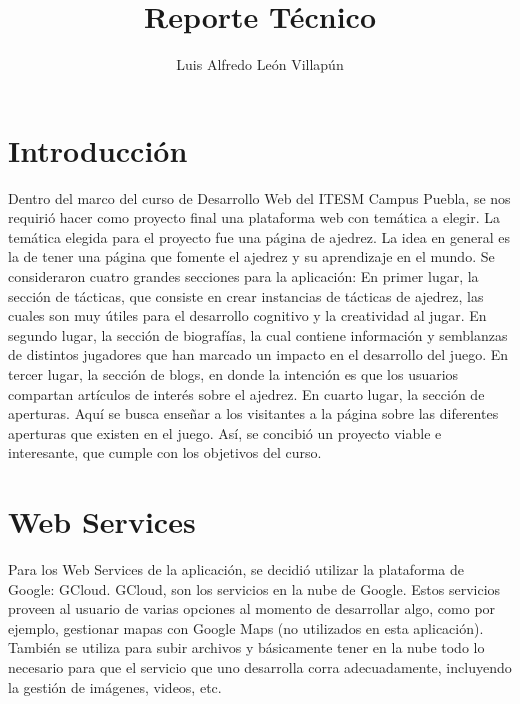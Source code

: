 \documentclass{article}
\title{Reporte Técnico}
\author{Luis Alfredo León Villapún}
\begin{document}
	\maketitle
	\newpage
	
	\tableofcontents
	\newpage
	
	\section{Introducción}
	Dentro del marco del curso de Desarrollo Web del ITESM Campus Puebla, se nos requirió hacer como proyecto final una plataforma web con temática a elegir.
	\linebreak
	La temática elegida para el proyecto fue una página de ajedrez. La idea en general es la de tener una página que fomente el ajedrez y su aprendizaje en el mundo.
	\linebreak
	Se consideraron cuatro grandes secciones para la aplicación: 
	\linebreak
	En primer lugar, la sección de tácticas, que consiste en crear instancias de tácticas de ajedrez, las cuales son muy útiles para el desarrollo cognitivo y la creatividad al jugar.
	\linebreak
	En segundo lugar, la sección de biografías, la cual contiene información y semblanzas de distintos jugadores que han marcado un impacto en el desarrollo del juego.
	\linebreak
	En tercer lugar, la sección de blogs, en donde la intención es que los usuarios compartan artículos de interés sobre el ajedrez.
	\linebreak
	En cuarto lugar, la sección de aperturas. Aquí se busca enseñar a los visitantes a la página sobre las diferentes aperturas que existen en el juego.
	\linebreak
	Así, se concibió un proyecto viable e interesante, que cumple con los objetivos del curso.
			
	
	\section{Web Services}
	
	Para los Web Services de la aplicación, se decidió utilizar la plataforma de Google: GCloud.
	\linebreak
	GCloud, son los servicios en la nube de Google. Estos servicios proveen al usuario de varias opciones al momento de desarrollar algo, como por ejemplo, gestionar mapas con Google Maps (no utilizados en esta aplicación). También se utiliza para subir archivos y básicamente tener en la nube todo lo necesario para que el servicio que uno desarrolla corra adecuadamente, incluyendo la gestión de imágenes, videos, etc.
	
\end{document}
